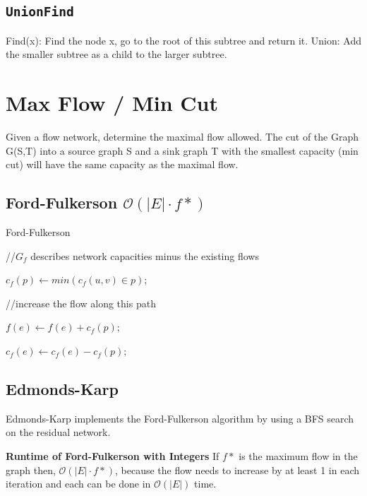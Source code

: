 \documentclass[9pt,landscape,a4paper, table]{extarticle}
\begin{document}
\begin{multicols*}{3}
\subsection{\texttt{UnionFind}}
Find(x): Find the node x, go to the root of this subtree and return it.
Union: Add the smaller subtree as a child to the larger subtree.

\section{Max Flow / Min Cut}
Given a flow network, determine the maximal flow allowed.
The cut of the Graph G(S,T) into a source graph S and a sink graph T with the smallest capacity (min cut) will have the same capacity as the maximal flow.

\subsection{Ford-Fulkerson $\mathcal{O}(|E| \cdot f*)$}

{\scriptsize
\begin{algorithm}[H]
    \caption{Ford-Fulkerson}
    
    \SetAlgoLined
    
    //$G_f$ describes network capacities minus the existing flows
    
    {
        $c_f(p) \leftarrow min( c_f(u,v)  \in p )$;
        
        //increase the flow along this path
        
         {
            $f(e) \leftarrow f(e) + c_f(p)$;
            
            $c_f(e) \leftarrow c_f(e) - c_f(p)$;
            
        }
    }
\end{algorithm}}

\subsection{Edmonds-Karp}
Edmonds-Karp implements the Ford-Fulkerson algorithm by using a BFS search on the residual network.

\textbf{Runtime of Ford-Fulkerson with Integers}
If $f*$ is the maximum flow in the graph then,
$\mathcal{O}(|E| \cdot f*)$, because the flow needs to increase by at least 1 in each iteration and each can be done in $\mathcal{O}(|E|)$ time. 


\end{multicols*}
\end{document}
